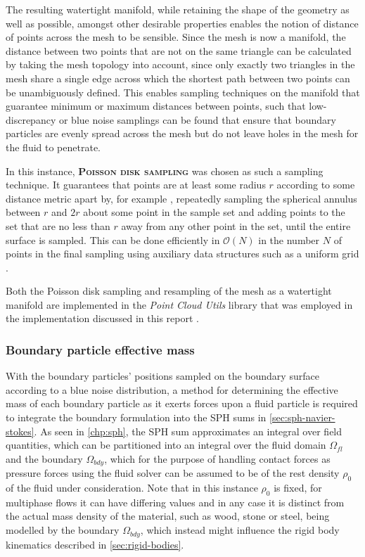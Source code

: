 \documentclass[oneside, a4paper]{book}
\newcommand\emphasis[1]{{\scshape\bfseries#1}}
\newcounter{phase}[algorithm]
\begin{document}
    The resulting watertight manifold, while retaining the shape of the geometry as well as possible, amongst other desirable properties enables the notion of distance of points across the mesh to be sensible. Since the mesh is now a manifold, the distance between two points that are not on the same triangle can be calculated by taking the mesh topology into account, since only exactly two triangles in the mesh share a single edge across which the shortest path between two points can be unambiguously defined. This enables sampling techniques on the manifold that guarantee minimum or maximum distances between points, such that low-discrepancy or blue noise samplings can be found that ensure that boundary particles are evenly spread across the mesh but do not leave holes in the mesh for the fluid to penetrate.

    In this instance, \emphasis{Poisson disk sampling} was chosen as such a sampling technique. It guarantees that points are at least some radius $r$ according to some distance metric apart by, for example \autocite{fast-poisson-disk-sampling}, repeatedly sampling the spherical annulus between $r$ and $2r$ about some point in the sample set and adding points to the set that are no less than $r$ away from any other point in the set, until the entire surface is sampled. This can be done efficiently in $\mathcal{O}(N)$ in the number $N$ of points in the final sampling using auxiliary data structures such as a uniform grid \autocite{fast-poisson-disk-sampling}. 

    Both the Poisson disk sampling and resampling of the mesh as a watertight manifold are implemented in the \textit{Point Cloud Utils} library that was employed in the implementation discussed in this report \autocite{pcu}.

    \subsubsection{Boundary particle effective mass}
    With the boundary particles' positions sampled on the boundary surface according to a blue noise distribution, a method for determining the effective mass of each boundary particle as it exerts forces upon a fluid particle is required to integrate the boundary formulation into the SPH sums in \autoref{sec:sph-navier-stokes}. As seen in \autoref{chp:sph}, the SPH sum approximates an integral over field quantities, which can be partitioned into an integral over the fluid domain $\Omega_{fl}$ and the boundary $\Omega_{bdy}$, which for the purpose of handling contact forces as pressure forces using the fluid solver can be assumed to be of the rest density $\rho_0$ of the fluid under consideration. Note that in this instance $\rho_0$ is fixed, for multiphase flows it can have differing values and in any case it is distinct from the actual mass density of the material, such as wood, stone or steel, being modelled by the boundary $\Omega_{bdy}$, which instead might influence the rigid body kinematics described in \autoref{sec:rigid-bodies}.
\end{document}

